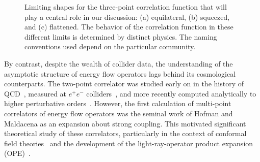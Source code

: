 \documentclass[letterpaper,11pt]{article}
\begin{document}
\begin{figure}
\begin{center}
\qquad
{}\qquad
{}
\end{center}
\caption{
%
%
Limiting shapes for the three-point correlation function that will play a central role in our discussion: (a) equilateral, (b) squeezed, and (c) flattened.
%
The behavior of the correlation function in these different limits is determined by distinct physics.
%
The naming conventions used depend on the particular community.
}
\label{fig:shapes}
\end{figure}




By contrast, despite the wealth of collider data, the understanding of the asymptotic structure of energy flow operators lags behind its cosmological counterparts.
%
The two-point correlator was studied early on in the history of QCD~\cite{Basham:1978bw,Basham:1977iq,Basham:1979gh,Basham:1978zq,Konishi:1979cb}, measured at $e^+e^-$ colliders~\cite{SLD:1994idb,L3:1992btq,OPAL:1991uui,TOPAZ:1989yod,TASSO:1987mcs,JADE:1984taa,Fernandez:1984db,Wood:1987uf,CELLO:1982rca,PLUTO:1985yzc}, and more recently computed analytically to higher perturbative orders~\cite{Belitsky:2013ofa,Dixon:2018qgp,Henn:2019gkr,Luo:2019nig}.
%
However, the first calculation of multi-point correlators of energy flow operators was the seminal work of Hofman and Maldacena \cite{Hofman:2008ar} as an expansion about strong coupling.
%
This motivated significant theoretical study of these correlators, particularly in the context of conformal field theories~\cite{Belitsky:2013xxa,Belitsky:2013bja,Belitsky:2013ofa,Belitsky:2014zha,Korchemsky:2015ssa} and the development of the light-ray-operator product expansion (OPE)~\cite{Hofman:2008ar,Kravchuk:2018htv,Kologlu:2019bco,Kologlu:2019mfz,Chang:2020qpj}.
\end{document}
